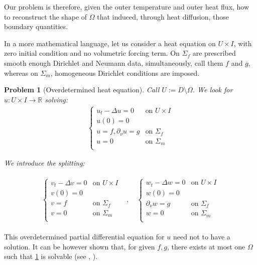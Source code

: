 \documentclass[english,a4paper,9pt,oneside]{scrbook}	%
\theoremstyle{break}
\newtheorem{pb}[equation]{Problem}
\theoremstyle{remark}
\newcommand{\mR}{\mathbb{R}}
\begin{document}
Our problem is therefore, given the outer temperature and outer heat flux, how to reconstruct the shape of $\Omega$ that induced, through heat diffusion, those boundary quantities.

In a more mathematical language, let us consider a heat equation on $U\times I$, with zero initial condition and no volumetric forcing term. On $\Sigma_f$ are prescribed smooth enough Dirichlet and Neumann data, simultaneously, call them $f$ and $g$, whereas on $\Sigma_m$, homogeneous Dirichlet conditions are imposed.

\begin{pb}[Overdetermined heat equation]
\label{pb:pdes}
Call $U:=D\setminus \Omega$. We look for $u:U \times I \rightarrow \mR$ solving:
\begin{align*}
\left\{\begin{matrix}
u_t -\Delta u=0 & \text{on }U\times I \\ 
u(0)=0 & \\ 
u = f, \partial_\nu u=g & \text{on }\Sigma_f\\
u = 0 & \text{on }\Sigma_m\\
\end{matrix}\right.
\end{align*}

We introduce the splitting:

\begin{align*}
\begin{matrix}
\left\{\begin{matrix}
v_t -\Delta v=0 & \text{on }U\times I \\ 
v(0)=0 & \\ 
v = f& \text{on }\Sigma_f\\
v = 0 & \text{on }\Sigma_m\\
\end{matrix}\right. &, \quad  \left\{\begin{matrix}
w_t -\Delta w=0 & \text{on }U\times I \\ 
w(0)=0 & \\ 
\partial_\nu w=g & \text{on }\Sigma_f\\
w = 0 & \text{on }\Sigma_m\\
\end{matrix}\right.
\end{matrix}
\end{align*}
\end{pb}

This overdetermined partial differential equation for $u$ need not to have a solution. It can be however shown that, for given $f,g$, there exists at most one $\Omega$ such that \cref{pb:pdes} is solvable (see \cite{chapko1}, \cite{chapko2}).
\end{document}
